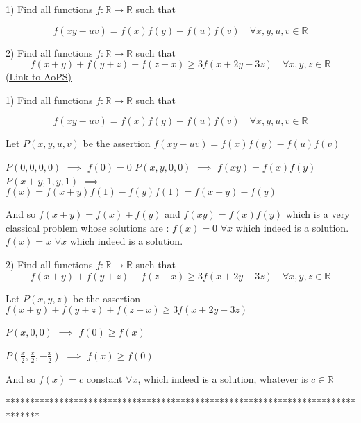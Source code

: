 \begin{problem}
	1) Find all functions $f:\mathbb{R}\to\mathbb{R}$ such that 

\[f(xy-uv)=f(x)f(y)-f(u)f(v) \quad \forall x,y,u,v\in\mathbb{R}\]

2) Find all functions $f:\mathbb{R}\to\mathbb{R}$ such that 
\[f(x+y)+f(y+z)+f(z+x)\geq 3f(x+2y+3z)  \quad \forall x,y,z \in\mathbb{R}\]
	\flushright \href{https://artofproblemsolving.com/community/c6h562411}{(Link to AoPS)}
\end{problem}



\begin{solution}
	\begin{tcolorbox}1) Find all functions $f:\mathbb{R}\to\mathbb{R}$ such that 

\[f(xy-uv)=f(x)f(y)-f(u)f(v) \quad \forall x,y,u,v\in\mathbb{R}\]\end{tcolorbox}
Let $P(x,y,u,v)$ be the assertion $f(xy-uv)=f(x)f(y)-f(u)f(v)$

$P(0,0,0,0)$ $\implies$ $f(0)=0$
$P(x,y,0,0)$ $\implies$ $f(xy)=f(x)f(y)$
$P(x+y,1,y,1)$ $\implies$ $f(x)=f(x+y)f(1)-f(y)f(1)=f(x+y)-f(y)$

And so $f(x+y)=f(x)+f(y)$ and $f(xy)=f(x)f(y)$ which is a very classical problem whose solutions are :
$\boxed{f(x)=0}$ $\forall x$ which indeed is a solution.
$\boxed{f(x)=x}$ $\forall x$ which indeed is a solution.
\end{solution}



\begin{solution}
	\begin{tcolorbox}2) Find all functions $f:\mathbb{R}\to\mathbb{R}$ such that 
\[f(x+y)+f(y+z)+f(z+x)\geq 3f(x+2y+3z)  \quad \forall x,y,z \in\mathbb{R}\]\end{tcolorbox}
Let $P(x,y,z)$ be the assertion $f(x+y)+f(y+z)+f(z+x)\ge 3f(x+2y+3z)$

$P(x,0,0)$ $\implies$ $f(0)\ge f(x)$

$P(\frac x2,\frac x2,-\frac x2)$ $\implies$ $f(x)\ge f(0)$

And so $\boxed{f(x)=c}$ constant $\forall x$, which indeed is a solution, whatever is $c\in\mathbb R$
\end{solution}
*******************************************************************************
-------------------------------------------------------------------------------

